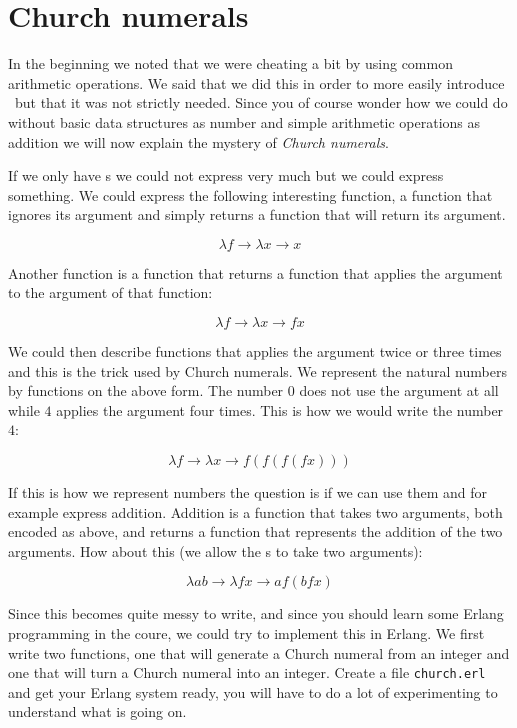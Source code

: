 \documentclass[a4paper,11pt]{article}
\begin{document}
\section{Church numerals}

In the beginning we noted that we were cheating a bit by using common
arithmetic operations. We said that we did this in order to more
easily introduce \lamc\ but that it was not strictly needed. Since you
of course wonder how we could do without basic data structures as
number and simple arithmetic operations as addition we will now
explain the mystery of {\em Church numerals}.

If we only have \lame s we could not express very much but we could
express something. We could express the following interesting
function, a function that ignores its argument and simply returns a
function that will return its argument. 

$$\lambda f \rightarrow \lambda x \rightarrow x$$

Another function is a function that returns a function that applies
the argument to the argument of that function:

$$\lambda f \rightarrow \lambda x \rightarrow f x$$

We could then describe functions that applies the argument twice
or three times and this is the trick used by Church numerals. We
represent the natural numbers by functions on the above form. The number $0$
does not use the argument at all while $4$ applies the argument four
times. This is how we would write the number $4$:

$$\lambda f \rightarrow \lambda x \rightarrow f (f (f (f x)))$$

If this is how we represent numbers the question is if we can
use them and for example express addition. Addition is a
function that takes two arguments, both encoded as above, and returns
a function that represents the addition of the two arguments. How
about this (we allow the \lama s to take two arguments):

$$\lambda a b \rightarrow \lambda f x \rightarrow a f (b f x)$$

Since this becomes quite messy to write, and since you should learn
some Erlang programming in the coure, we could try to implement this
in Erlang. We first write two functions, one that will generate a
Church numeral from an integer and one that will turn a Church numeral
into an integer. Create a file {\tt church.erl} and get your Erlang
system ready, you will have to do a lot of experimenting to understand
what is going on.
\end{document}

